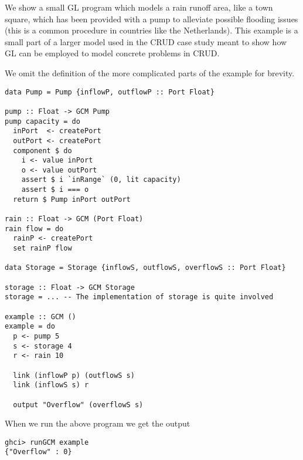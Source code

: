 We show a small GL program which models a rain runoff area,
like a town square, which has been provided with a pump to
alleviate possible flooding issues (this is a common procedure
in countries like the Netherlands). This example is a small part of
a larger model used in the CRUD case study meant to show how GL can be
employed to model concrete problems in CRUD.

We omit the definition of the
more complicated parts of the example for brevity.
\begin{verbatim}
data Pump = Pump {inflowP, outflowP :: Port Float}

pump :: Float -> GCM Pump
pump capacity = do
  inPort  <- createPort
  outPort <- createPort
  component $ do
    i <- value inPort
    o <- value outPort
    assert $ i `inRange` (0, lit capacity)
    assert $ i === o
  return $ Pump inPort outPort

rain :: Float -> GCM (Port Float)
rain flow = do
  rainP <- createPort
  set rainP flow

data Storage = Storage {inflowS, outflowS, overflowS :: Port Float}

storage :: Float -> GCM Storage
storage = ... -- The implementation of storage is quite involved

example :: GCM ()
example = do
  p <- pump 5
  s <- storage 4
  r <- rain 10

  link (inflowP p) (outflowS s)
  link (inflowS s) r

  output "Overflow" (overflowS s)
\end{verbatim}
When we run the above program we get the output
\begin{verbatim}
ghci> runGCM example
{"Overflow" : 0}
\end{verbatim}

